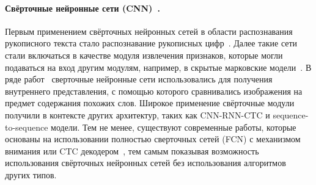 \paragraph{Свёрточные нейронные сети (CNN)~\cite{o2015introduction}.}{
    Первым применением свёрточных нейронных сетей в области распознавания рукописного текста стало распознавание рукописных цифр~\cite{lecun1989backpropagation}.
    Далее такие сети стали включаться в качестве модуля извлечения признаков, которые могли подаваться на вход другим модулям,
    например, в скрытые марковские модели~\cite{bluche2013tandem}.
    В ряде работ~\cite{krishnan2016deep, krishnan2016matching} сверточные нейронные сети использовались для получения внутреннего представления,
    с помощью которого сравнивались изображения на предмет содержания похожих слов.
    Широкое применение свёрточные модули получили в контексте других архитектур, таких как CNN-RNN-CTC и sequence-to-sequence модели.
    Тем не менее, существуют современные работы, которые основаны на использовании полностью сверточных сетей (FCN)
    с механизмом внимания или CTC декодером~\cite{yousef2020accurate,coquenet2020recurrence},
    тем самым показывая возможность использования свёрточных нейронных сетей без использования алгоритмов других типов.
}

